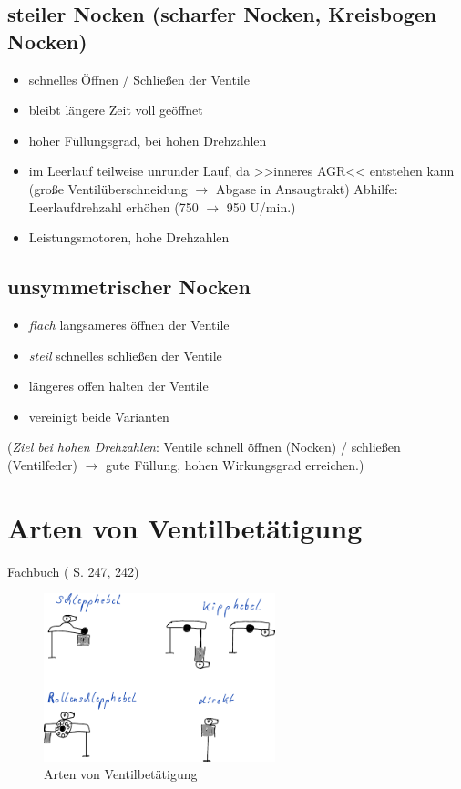 \subsection{steiler Nocken (scharfer Nocken, Kreisbogen
Nocken)}\label{steiler-nocken-scharfer-nocken-kreisbogen-nocken}

\begin{itemize}
\item
  schnelles Öffnen / Schließen der Ventile
\item
  bleibt längere Zeit voll geöffnet
\item
  hoher Füllungsgrad, bei hohen Drehzahlen
\item
  im Leerlauf teilweise unrunder Lauf, da >>inneres AGR<< entstehen kann
  (große Ventilüberschneidung $\to$ Abgase in Ansaugtrakt) Abhilfe:
  Leerlaufdrehzahl erhöhen (750 $\to$ 950 U/min.)
\item
  Leistungsmotoren, hohe Drehzahlen
\end{itemize}

\subsection{unsymmetrischer Nocken}\label{unsymmetrischer-nocken}

\begin{itemize}
\item
  \emph{flach} langsameres öffnen der Ventile
\item
  \emph{steil} schnelles schließen der Ventile
\item
  längeres offen halten der Ventile
\item
  vereinigt beide Varianten
\end{itemize}

(\emph{Ziel bei hohen Drehzahlen}: Ventile schnell öffnen (Nocken) /
schließen (Ventilfeder) $\to$ gute Füllung, hohen Wirkungsgrad
erreichen.)

\section{Arten von
Ventilbetätigung}\label{arten-von-ventilbetaetigung}

Fachbuch (\textcite{brand:2020:fachkundeKfz} S. 247, 242)

\begin{figure}[!ht]%
\centering
\includegraphics[width=0.6\textwidth]{images/Skizze/03_Arten-von-Ventilbetaetigung_Skizze.pdf}
\caption{Arten von Ventilbetätigung}
\end{figure}

